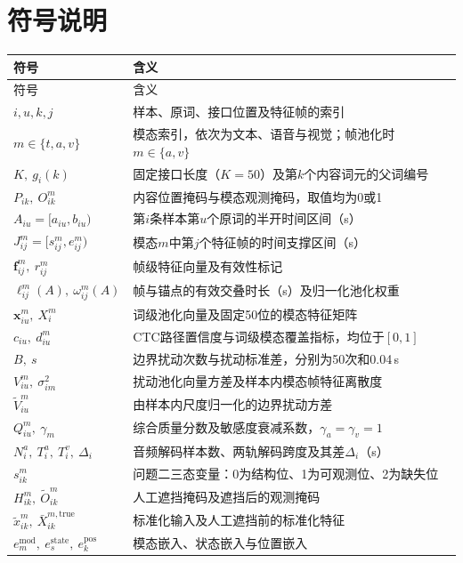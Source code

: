 \section{符号说明}
\begin{longtable}{>{\centering\arraybackslash}p{3.6cm}>{\centering\arraybackslash}p{\dimexpr\linewidth-3.6cm-4\tabcolsep\relax}}
\toprule
符号 & 含义 \\
\midrule
\endfirsthead
\toprule
符号 & 含义 \\
\midrule
\endhead
\bottomrule
\endlastfoot
$i,u,k,j$ & 样本、原词、接口位置及特征帧的索引 \\
$m\in\{t,a,v\}$ & 模态索引，依次为文本、语音与视觉；帧池化时$m\in\{a,v\}$ \\
$K,\ g_i(k)$ & 固定接口长度（$K=50$）及第$k$个内容词元的父词编号 \\
$P_{ik},\ O^m_{ik}$ & 内容位置掩码与模态观测掩码，取值均为0或1 \\
$A_{iu}=[a_{iu},b_{iu})$ & 第$i$条样本第$u$个原词的半开时间区间（s） \\
$J^m_{ij}=[s^m_{ij},e^m_{ij})$ & 模态$m$中第$j$个特征帧的时间支撑区间（s） \\
$\bm f^m_{ij},\ r^m_{ij}$ & 帧级特征向量及有效性标记 \\
$\ell^m_{ij}(A),\ \omega^m_{ij}(A)$ & 帧与锚点的有效交叠时长（s）及归一化池化权重 \\
$\bm x^m_{iu},\ X^m_i$ & 词级池化向量及固定50位的模态特征矩阵 \\
$c_{iu},\ d^m_{iu}$ & CTC路径置信度与词级模态覆盖指标，均位于$[0,1]$ \\
$B,\ s$ & 边界扰动次数与扰动标准差，分别为50次和0.04\,s \\
$V^m_{iu},\ \sigma_{im}^2$ & 扰动池化向量方差及样本内模态帧特征离散度 \\
$\widetilde V^m_{iu}$ & 由样本内尺度归一化的边界扰动方差 \\
$Q^m_{iu},\ \gamma_m$ & 综合质量分数及敏感度衰减系数，$\gamma_a=\gamma_v=1$ \\
$N_i^a,\ T_i^a,\ T_i^v,\ \Delta_i$ & 音频解码样本数、两轨解码跨度及其差$\Delta_i$（s） \\
$s^m_{ik}$ & 问题二三态变量：0为结构位、1为可观测位、2为缺失位 \\
$H^m_{ik},\ \widetilde O^m_{ik}$ & 人工遮挡掩码及遮挡后的观测掩码 \\
$\widetilde x^m_{ik},\ \bar X^{m,\mathrm{true}}_{ik}$ & 标准化输入及人工遮挡前的标准化特征 \\
$e^{\mathrm{mod}}_m,\ e^{\mathrm{state}}_s,\ e^{\mathrm{pos}}_k$ & 模态嵌入、状态嵌入与位置嵌入 \\

\end{longtable}
